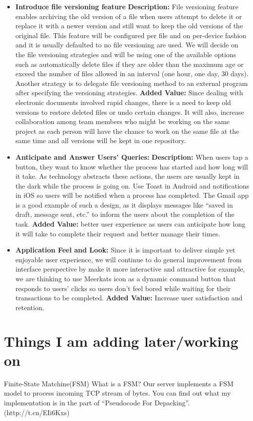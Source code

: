 \documentclass{article}
\begin{document}
\begin{itemize}
\item \textbf{Introduce file versioning feature}
\textbf{Description:} File versioning feature enables archiving the old version of a file when users attempt to delete it or replace it with a newer version and still want to keep the old versions of the original file. This feature will be configured per file and on per-device fashion and it is usually defaulted to no file versioning are used.
We will decide on the file versioning strategies and will be using one of the available options such as automatically delete files if they are older than the maximum age or exceed the number of files allowed in an interval (one hour, one day, 30 days). Another strategy is to delegate file versioning method to an external program after specifying the versioning strategies.
\textbf{Added Value:} Since dealing with electronic documents involved rapid changes, there is a need to keep old versions to restore deleted files or undo certain changes. It will also, increase collaboration among team members who might be working on the same project as each person will have the chance to work on the same file at the same time and all versions will be kept in one repository.


\item \textbf{Anticipate and Answer Users’ Queries:}
\textbf{Description:} When users tap a button, they want to know whether the process has started and how long will it take. As technology abstracts these actions, the users are usually kept in the dark while the process is going on. Use Toast in Android and notifications in iOS so users will be notified when a process has completed. The Gmail app is a good example of such a design, as it displays messages like “saved in draft, message sent, etc.” to inform the users about the completion of the task.
\textbf{Added Value:} better user experience as users can anticipate how long it will take to complete their request and better manage their times.

\item \textbf{Application Feel and Look:} Since it is important to deliver simple yet enjoyable user experience, we will continue to do general improvement from interface perspective by make it more interactive and attractive for example, we are thinking to use Meerkats icon as a dynamic command button that responds to users’ clicks so users don’t feel bored while waiting for their transactions to be completed.
\textbf{Added Value:} Increase user satisfaction and retention.

\end{itemize}

\section{Things I am adding later/working on}
Finite-State Matchine(FSM)
What is a FSM?
Our server implements a FSM model to process incoming TCP stream of bytes.
You can find out what my implementation is in the part of “Pseudocode For Depacking”. (http://t.cn/EIi6Kxs)

\nocite{*}



\end{document}
